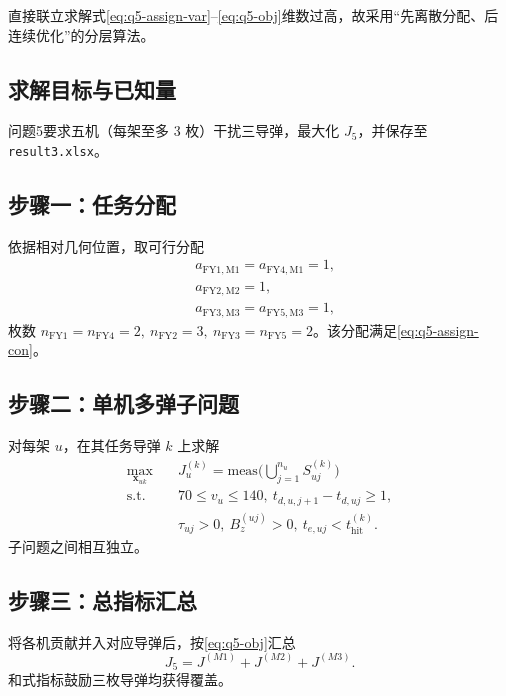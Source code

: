 \documentclass[withoutpreface,bwprint]{cumcmthesis}
\begin{document}
直接联立求解式\eqref{eq:q5-assign-var}--\eqref{eq:q5-obj}维数过高，故采用“先离散分配、后连续优化”的分层算法。

\subsection{求解目标与已知量}
问题5要求五机（每架至多 3 枚）干扰三导弹，最大化 $J_5$，并保存至 \texttt{result3.xlsx}。

\subsection{步骤一：任务分配}
依据相对几何位置，取可行分配
\begin{equation}
\begin{aligned}
&a_{\mathrm{FY1},\mathrm{M1}}=a_{\mathrm{FY4},\mathrm{M1}}=1,\\
&a_{\mathrm{FY2},\mathrm{M2}}=1,\\
&a_{\mathrm{FY3},\mathrm{M3}}=a_{\mathrm{FY5},\mathrm{M3}}=1,
\end{aligned}
\label{eq:q5-assign-sol}
\end{equation}
枚数 $n_{\mathrm{FY1}}=n_{\mathrm{FY4}}=2,\ n_{\mathrm{FY2}}=3,\ n_{\mathrm{FY3}}=n_{\mathrm{FY5}}=2$。该分配满足\eqref{eq:q5-assign-con}。

\subsection{步骤二：单机多弹子问题}
对每架 $u$，在其任务导弹 $k$ 上求解
\begin{equation}
\begin{aligned}
\max_{\mathbf{x}_{uk}}\quad
&J_u^{(k)}=\mathrm{meas}\Big(\bigcup_{j=1}^{n_u}S_{uj}^{(k)}\Big)\\
\mathrm{s.t.}\quad
&70\le v_u\le 140,\ 
t_{d,u,j+1}-t_{d,uj}\ge 1,\\
&\tau_{uj}>0,\ 
B^{(uj)}_z>0,\ 
t_{e,uj}<t_{\mathrm{hit}}^{(k)}.
\end{aligned}
\label{eq:q5-sub}
\end{equation}
子问题之间相互独立。

\subsection{步骤三：总指标汇总}
将各机贡献并入对应导弹后，按\eqref{eq:q5-obj}汇总
\begin{equation}
J_5=J^{(M1)}+J^{(M2)}+J^{(M3)}.
\label{eq:J5}
\end{equation}
和式指标鼓励三枚导弹均获得覆盖。
\end{document}
